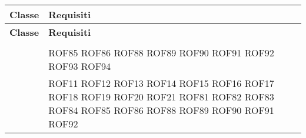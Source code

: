 \documentclass[../DefinizioneDiProdotto_v3.0.0.tex]{subfiles}
\begin{document}
\begin{longtable}{p{8.5cm}!{\VRule[1pt]}p{2.5cm}}
	\color{white} \textbf{Classe}                                                                               & \color{white} \textbf{Requisiti} \\
	\endfirsthead
	\color{white} \textbf{Classe}                                                                               & \color{white} \textbf{Requisiti} \\
	\endhead
	                                                                             &                                  \\
	                                                              & ROF85 \newline
	ROF86 \newline
	ROF88 \newline
	ROF89 \newline
	ROF90 \newline
	ROF91 \newline
	ROF92 \newline
	ROF93 \newline
	ROF94 \\
	                                                                  & 	ROF11 \newline
	ROF12 \newline
	ROF13 \newline
	ROF14 \newline
	ROF15 \newline
	ROF16 \newline
	ROF17 \newline
	ROF18 \newline
	ROF19 \newline
	ROF20 \newline
	ROF21 \newline
	ROF81 \newline
	ROF82 \newline
	ROF83 \newline
	ROF84 \newline
	ROF85 \newline
	ROF86 \newline
	ROF88 \newline
	ROF89 \newline
	ROF90 \newline
	ROF91 \newline
	ROF92 \newline

\end{longtable}
\end{document}
